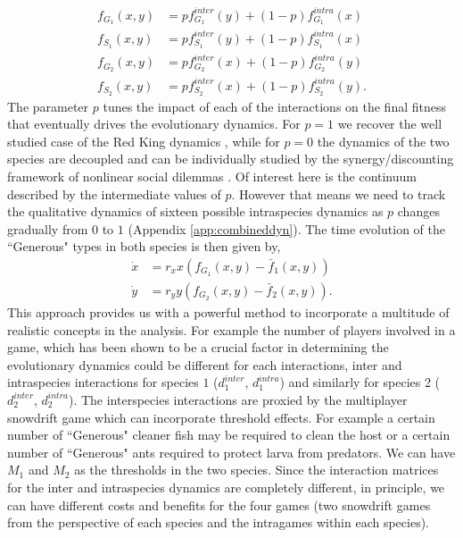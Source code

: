 \documentclass[12pt]{article}
\begin{document}
%
\begin{align}
	f_{G_1} (x,y) &= p f^{inter}_{G_1} (y) + (1-p) f^{intra}_{G_1} (x) \\
	f_{S_1} (x,y) &= p f^{inter}_{S_1} (y) + (1-p) f^{intra}_{S_1} (x)  \\
	f_{G_2} (x,y) &= p f^{inter}_{G_2} (x) + (1-p) f^{intra}_{G_2} (y) \\
	f_{S_2} (x,y) &= p f^{inter}_{S_2} (x) + (1-p) f^{intra}_{S_2} (y).
\label{eq:combinedfiteqs}
\end{align}
%
The parameter $p$ tunes the impact of each of the interactions on the final fitness that eventually drives the evolutionary dynamics.
For $p=1$ we recover the well studied case of the Red King dynamics \citep{gokhale:PRSB:2012}, while for $p=0$ the dynamics of the two species are  decoupled and can be individually studied by the synergy/discounting framework of nonlinear social dilemmas \citep{hauert:JTB:2006a}.
Of interest here is the continuum described by the intermediate values of $p$.
However that means we need to track the qualitative dynamics of sixteen possible intraspecies dynamics as $p$ changes gradually from $0$ to $1$ (Appendix \ref{app:combineddyn}). 
The time evolution of the ``Generous" types in both species is then given by,
%
\begin{align}
\dot{x} &= r_x x \left(f_{G_1}(x,y) -  \bar{f}_1(x,y) \right)  \\
\dot{y} &= r_y y \left(f_{G_2}(x,y) -  \bar{f}_2(x,y) \right).
\label{eq:repeq}
\end{align}
%
This approach provides us with a powerful method to incorporate a multitude of realistic concepts in the analysis.
For example the number of players involved in a game, which has been shown to be a crucial factor in determining the evolutionary dynamics could be different for each interactions, inter and intraspecies interactions for species $1$ ($d^{inter}_1$, $d^{intra}_1$) and similarly for species 2 ($d^{inter}_2$, $d^{intra}_2$). 
The interspecies interactions are proxied by the multiplayer snowdrift game which can incorporate threshold effects.
For example a certain number of ``Generous" cleaner fish may be required to clean the host or a certain number of ``Generous" ants required to protect larva from predators.
We can have $M_1$ and $M_2$ as the thresholds in the two species.
Since the interaction matrices for the inter and intraspecies dynamics are completely different, in principle, we can have different costs and benefits for the four games (two snowdrift games from the perspective of each species and the intragames within each species).
\end{document}

